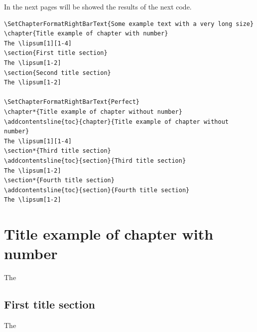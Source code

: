\documentclass[a4paper,10pt]{book}
\begin{document}
In the next pages will be showed the results of the next code.
\begin{lstlisting}[style=mystyle]
\SetChapterFormatRightBarText{Some example text with a very long size}
\chapter{Title example of chapter with number}
The \lipsum[1][1-4]
\section{First title section}
The \lipsum[1-2]
\section{Second title section}
The \lipsum[1-2]

\SetChapterFormatRightBarText{Perfect}
\chapter*{Title example of chapter without number}
\addcontentsline{toc}{chapter}{Title example of chapter without number}
The \lipsum[1][1-4]
\section*{Third title section}
\addcontentsline{toc}{section}{Third title section}
The \lipsum[1-2]
\section*{Fourth title section}
\addcontentsline{toc}{section}{Fourth title section}
The \lipsum[1-2]
\end{lstlisting}

\chapter{Title example of chapter with number}
The \lipsum[1][1-4]
\section{First title section}
The \lipsum[1-2]
\end{document}
